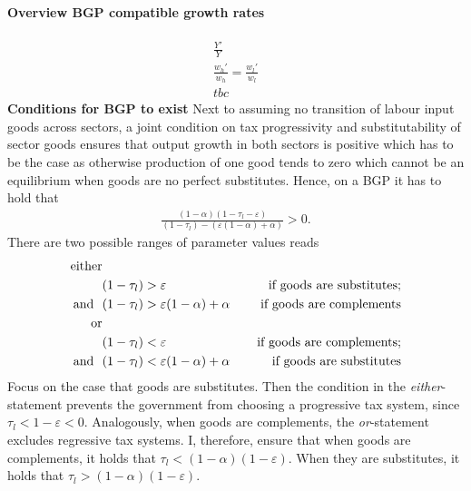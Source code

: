 \paragraph{Overview BGP compatible growth rates}
\begin{align}
\frac{Y'}{Y}\\
\frac{w_h'}{w_h}=\frac{w_l'}{w_l}\\
tbc
\end{align}
\textbf{Conditions for BGP to exist}
Next to assuming no transition of labour input goods across sectors, a joint condition on tax progressivity and substitutability of sector goods ensures that output growth in both sectors is positive which has to be the case as otherwise production of one good tends to zero which cannot be an equilibrium when goods are no perfect substitutes.
Hence, on a BGP it has to hold that 
\begin{align*}
\frac{(1-\alpha)(1-\tau_l-\varepsilon)}{(1-\tau_l)-(\varepsilon(1-\alpha)+\alpha)}>0.
\end{align*}
There are two possible ranges of parameter values reads
\begin{align*}
\text{either}\\	&(1-\tau_l)>\varepsilon\hspace{4mm}&\text{if goods are substitutes} ;\\ \text{and}\ \ & (1-\tau_l)>\varepsilon(1-\alpha)+\alpha\hspace{4mm}&\text{if goods are complements}\\
\text{or}\\	&(1-\tau_l)<\varepsilon\hspace{4mm}&\text{if goods are complements} ;\\ \text{and}\ \ & (1-\tau_l)<\varepsilon(1-\alpha)+\alpha\hspace{4mm}&\text{if goods are substitutes}
\end{align*}
Focus on the case that goods are substitutes. Then the condition in the \textit{either}-statement prevents the government from choosing a progressive tax system, since $\tau_l<1-\varepsilon<0$.
Analogously, when goods are complements, the \textit{or}-statement excludes regressive tax systems.
I, therefore, ensure that when goods are complements, it holds that $\tau_l<(1-\alpha)(1-\varepsilon)$. When they are substitutes, it holds that $\tau_l>(1-\alpha)(1-\varepsilon)$.



